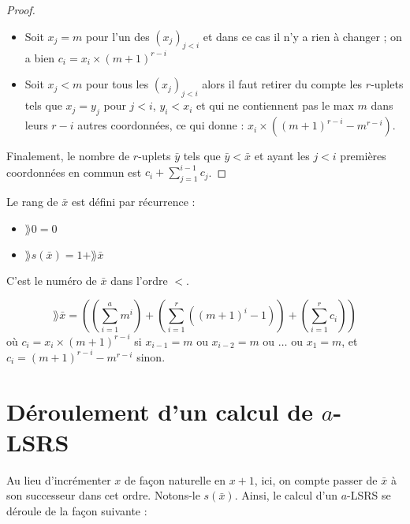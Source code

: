 \begin{proof}
			\begin{itemize}[itemsep=-1mm]
				\item	Soit $x_j = m$ pour l'un des $\left(x_j\right)_{j < i}$ et dans ce cas il n'y a rien à changer ; on a bien $c_i = x_i \times \left(m+1\right)^{r-i}$
				\item 	Soit $x_j < m$ pour tous les $\left(x_j\right)_{j < i}$ alors il faut retirer du compte les $r$-uplets tels que $x_j = y_j$ pour $j < i$, $y_i < x_i$ et qui ne contiennent pas le max $m$ dans leurs $r-i$ autres coordonnées, ce qui donne : $x_i \times \left(\left(m+1\right)^{r-i} - m^{r-i}\right)$.
			\end{itemize}
			
			Finalement, le nombre de $r$-uplets $\bar{y}$ tels que $\bar{y} < \bar{x}$ et ayant les $j<i$ premières coordonnées en commun est $c_i + \sum_{j=1}^{i-1} c_j$.
		\end{proof}
		
		\begin{definition}
			Le rang de $\bar{x}$ est défini par récurrence : 
			
			\begin{itemize}[itemsep=-1mm]
				\item 	$\rang{0} = 0$
				\item 	$\rang{s\left(\bar{x}\right)} = 1 + \rang{\bar{x}}$
			\end{itemize}
		\end{definition}
		
		C'est le numéro de $\bar{x}$ dans l'ordre $<$.
		
		\begin{coro}
			\label{coro:rang_bon_ordre}
			\[
				\rang{\bar{x}} = \left( \left( \sum_{i=1}^{a} m^i \right) + \left( \sum_{i=1}^{r} \left( \left(m+1\right)^i -1 \right) \right) + \left(\sum_{i=1}^{r} c_i \right) \right)
			\]
			où $c_i = x_i \times \left(m+1\right)^{r-i}$ si $x_{i-1} = m$ ou $x_{i-2} = m$ ou $\dots$ ou $x_{1} = m$, et $c_i = \left(m+1\right)^{r-i}-m^{r-i}$ sinon. 
		\end{coro}
		
		
	
	\section{Déroulement d'un calcul de $a$-LSRS}
	\label{par:deroulement_aLSRS}
		Au lieu d'incrémenter $x$ de façon naturelle en $x+1$, ici, on compte passer de $\bar{x}$ à son successeur dans cet ordre. Notons-le $s\left(\bar{x}\right)$. Ainsi, le calcul d'un $a$-LSRS se déroule de la façon suivante :
		
